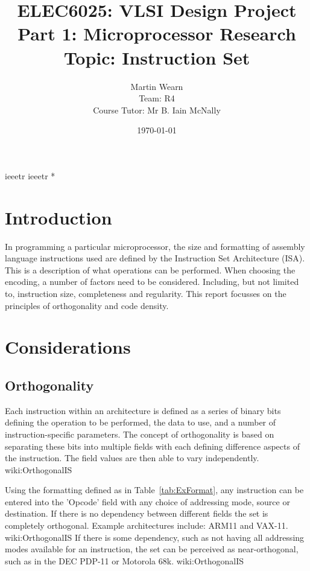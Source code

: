 \documentclass[12pt,a4paper]{article}
\title{ELEC6025: VLSI Design Project \\Part 1: Microprocessor Research\\Topic: Instruction Set}
\author{Martin Wearn\\ Team: R4\\Course Tutor: Mr B. Iain McNally}
\date{\today}
\begin{document}
{ieeetr}
{ieeetr}
\nocite{bibl}{*} %



\section{Introduction}
In programming a particular microprocessor, the size and formatting of assembly language instructions used are defined by the Instruction Set Architecture (ISA). This is a description of what operations can be performed. When choosing the encoding, a number of factors need to be considered. Including, but not limited to, instruction size, completeness and regularity. This report focusses on the principles of orthogonality and code density. 

\section{Considerations}

\subsection{Orthogonality}
Each instruction within an architecture is defined as a series of binary bits defining the operation to be performed, the data to use, and a number of instruction-specific parameters. The concept of orthogonality is based on separating these bits into multiple fields with each defining difference aspects of the instruction. The field values are then able to vary independently. \cite{ref}{wiki:OrthogonalIS}

Using the formatting defined as in Table~\ref{tab:ExFormat}, any instruction can be entered into the 'Opcode' field with any choice of addressing mode, source or destination. If there is no dependency between different fields the set is completely orthogonal. Example architectures include: ARM11 and VAX-11. \cite{ref}{wiki:OrthogonalIS}
If there is some dependency, such as not having all addressing modes available for an instruction, the set can be perceived as near-orthogonal, such as in the DEC PDP-11 or Motorola 68k. \cite{ref}{wiki:OrthogonalIS}
\end{document}
